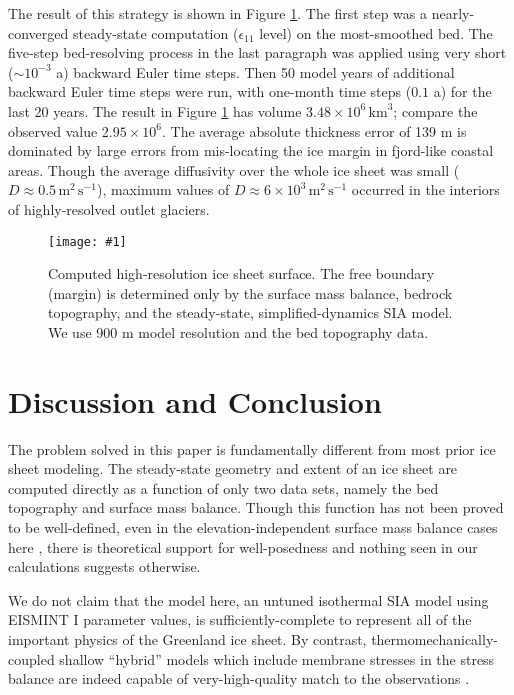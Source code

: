 \documentclass[review,letterpaper]{igs}
\newcommand{\onecol}[1]{\texttt{[image: \#1]}}
\newcommand\eps{\epsilon}
\begin{document}
The result of this strategy is shown in Figure \ref{fig:grnwinset}.  The first step was a nearly-converged steady-state computation ($\eps_{11}$ level) on the most-smoothed bed.  The five-step bed-resolving process in the last paragraph was applied using very short ($\sim10^{-3}$ a) backward Euler time steps.  Then 50 model years of additional backward Euler time steps were run, with one-month time steps ($0.1$ a) for the last 20 years.  The result in Figure \ref{fig:grnwinset} has volume $3.48\times 10^6\,\text{km}^3$; compare the observed value $2.95\times 10^6$.  The average absolute thickness error of 139 m is dominated by large errors from mis-locating the ice margin in fjord-like coastal areas.  Though the average diffusivity over the whole ice sheet was small ($D\approx 0.5\,\text{m}^2\,\text{s}^{-1}$), maximum values of $D\approx 6\times 10^3\,\text{m}^2\,\text{s}^{-1}$ occurred in the interiors of highly-resolved outlet glaciers.

\begin{figure}[ht]
\onecol{grnwinset.pdf}
\caption{Computed high-resolution ice sheet surface.  The free boundary (margin) is determined only by the surface mass balance, bedrock topography, and the steady-state, simplified-dynamics SIA model.  We use 900 m model resolution and the \MCB bed topography data.}
\label{fig:grnwinset}
\end{figure}


\section{Discussion and Conclusion}

The problem solved in this paper is fundamentally different from most prior ice sheet modeling.  The steady-state geometry and extent of an ice sheet are computed directly as a function of only two data sets, namely the bed topography and surface mass balance.  Though this function has not been proved to be well-defined, even in the elevation-independent surface mass balance cases here \citep[compare][]{Jouvetetal2011}, there is theoretical support for well-posedness \citep{JouvetBueler2012} and nothing seen in our calculations suggests otherwise.

We do not claim that the model here, an untuned isothermal SIA model using EISMINT I parameter values, is sufficiently-complete to represent all of the important physics of the Greenland ice sheet.  By contrast, thermomechanically-coupled shallow ``hybrid'' models which include membrane stresses in the stress balance are indeed capable of very-high-quality match to the observations \citep{Aschwandenetal2015}.
\end{document}
